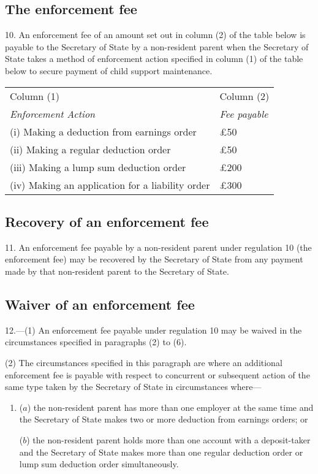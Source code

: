 \documentclass[12pt,a4paper]{article}
\begin{document}
\subsection[10. The enforcement fee]{The enforcement fee}

10.  An enforcement fee of an amount set out in column (2) of the table below is payable to the Secretary of State by a non-resident parent when the Secretary of State takes a method of enforcement action specified in column (1) of the table below to secure payment of child support maintenance.

\begin{center}
\noindent
\begin{tabular}{ll}
\hline
Column (1)	& Column (2)\\
\itshape Enforcement Action	&\itshape Fee payable\\
\hline
(i)  Making a deduction from earnings order	&£50\\
(ii)  Making a regular deduction order	&£50\\
(iii) Making a lump sum deduction order	&£200\\
(iv) Making an application for a liability order	&£300\\
\hline
\end{tabular}
\end{center}

\subsection[11. Recovery of an enforcement fee]{Recovery of an enforcement fee}

11.  An enforcement fee payable by a non-resident parent under regulation 10 (the enforcement fee) may be recovered by the Secretary of State from any payment made by that non-resident parent to the Secretary of State.

\subsection[12. Waiver of an enforcement fee]{Waiver of an enforcement fee}

12.—(1) An enforcement fee payable under regulation 10 may be waived in the circumstances specified in paragraphs (2) to (6).

(2) The circumstances specified in this paragraph are where an additional enforcement fee is payable with respect to concurrent or subsequent action of the same type taken by the Secretary of State in circumstances where—
\begin{enumerate}\item[]
($a$) the non-resident parent has more than one employer at the same time and the Secretary of State makes two or more deduction from earnings orders; or

($b$) the non-resident parent holds more than one account with a deposit-taker and the Secretary of State makes more than one regular deduction order or lump sum deduction order simultaneously.
\end{enumerate}
\end{document}
